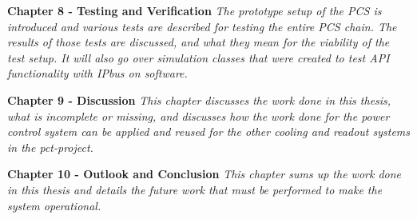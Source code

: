 \documentclass[main.tex]{subfiles}
\begin{document}
\textbf{Chapter 8 - Testing and Verification} \textit{The prototype setup of the PCS is introduced and various tests are described for testing the entire PCS chain. The results of those tests are discussed, and what they mean for the viability of the test setup. It will also go over simulation classes that were created to test API functionality with IPbus on software.}

\textbf{Chapter 9 - Discussion} \textit{This chapter discusses the work done in this thesis, what is incomplete or missing, and discusses how the work done for the power control system can be applied and reused for the other cooling and readout systems in the \gls{pct}-project.}

\textbf{Chapter 10 - Outlook and Conclusion} \textit{This chapter sums up the work done in this thesis and details the future work that must be performed to make the system operational.}
\end{document}

